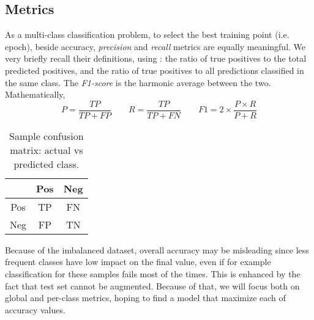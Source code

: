 \subsection{Metrics}\label{ssec:metrics}

As a multi-class classification problem, to select the best training point (i.e. epoch), beside accuracy, \textit{precision} and \textit{recall} metrics are equally meaningful.
We very briefly recall their definitions, using : the ratio of true positives to the total predicted positives, and the ratio of true positives to all predictions classified in the same class.
The \textit{F1-score} is the harmonic average between the two.
Mathematically,
\[ P = \frac{TP}{TP+FP} \qquad R = \frac{TP}{TP+FN} \qquad F1 = 2 \times \frac{P\times R}{P+R} \]

\begin{table}[ht]
    \centering
    \caption{Sample confusion matrix: actual vs predicted class.}
    \label{tab:class_mat}
    \begin{tabular}{c|cc}\toprule
        & Pos & Neg \\\midrule
    Pos & TP  & FN  \\
    Neg & FP  & TN  \\\bottomrule
    \end{tabular}
\end{table}


Because of the imbalanced dataset, overall accuracy may be misleading since less frequent classes have low impact on the final value, even if for example classification for these samples fails most of the times.
This is enhanced by the fact that test set cannot be augmented.
Because of that, we will focus both on global and per-class metrics, hoping to find a model that maximize each of accuracy values. %

